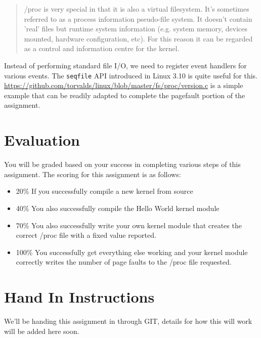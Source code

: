 \documentclass[11pt]{article}
\begin{document}
\begin{enumerate}
\begin{quote}
/proc is very special in that it is also a virtual filesystem. It's sometimes referred to as a process information pseudo-file system. It doesn't contain 'real' files but runtime system information (e.g. system memory, devices mounted, hardware configuration, etc). For this reason it can be regarded as a control and information centre for the kernel.
\end{quote}

Instead of performing standard file I/O, we need to register event handlers for various events. The \texttt{seqfile} API introduced in Linux 3.10 is quite useful for this. \url{https://github.com/torvalds/linux/blob/master/fs/proc/version.c} is a simple example that can be readily adapted to complete the pagefault portion of the assignment.
\end{enumerate}

\section*{Evaluation}

You will be graded based on your success in completing various steps of this assignment. The scoring for this assignment is as follows:

\begin{itemize}
\item 20\% If you successfully compile a new kernel from source
\item 40\% You also successfully compile the Hello World kernel module
\item 70\% You also successfully write your own kernel module that creates the correct /proc file with a fixed value reported.
\item 100\% You successfully get everything else working and your kernel module correctly writes the number of page faults to the /proc file requested. 
\end{itemize}


\section*{Hand In Instructions}

We'll be handing this assignment in through GIT, details for how this will work will be added here soon. 

\newpage
\end{document}
